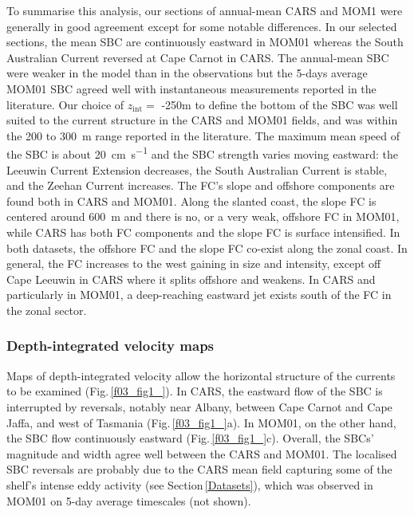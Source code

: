 \documentclass[preprint,3p,review,12pt]{elsarticle}
\newcommand{\sub}[1]{_{\text{#1}}}
\begin{document}
To summarise this analysis, our sections of annual-mean CARS and MOM1 were generally in good agreement except for some notable differences. In our selected sections, the mean SBC are continuously eastward in MOM01 whereas the South Australian Current reversed at Cape Carnot in CARS. The annual-mean SBC were weaker in the model than in the observations but the 5-days average MOM01 SBC agreed well with instantaneous measurements reported in the literature. Our choice of $z\sub{int} =$ -250\si{\meter} to define the bottom of the SBC was well suited to the current structure in the CARS and MOM01 fields, and was within the \num{200} to \SI{300}{\meter} range reported in the literature.
The maximum mean speed of the SBC is about
\SI{20}{\centi\meter\per\second} and
the SBC strength varies moving eastward: the Leeuwin Current Extension decreases, the South Australian Current is stable, and the Zeehan Current increases.
The FC's slope and offshore components are
found both in CARS and MOM01. Along the slanted coast, the slope FC is centered around \SI{600}{\meter} and there is no, or a very weak, offshore FC in MOM01, while CARS has both FC components and the slope FC is surface intensified. In both datasets, the offshore FC and the slope FC co-exist along the zonal coast. In general, the FC increases to the west gaining in size and intensity, except off Cape Leeuwin in CARS where it splits offshore and weakens. In CARS and particularly in MOM01, a deep-reaching eastward jet exists south of the FC in the zonal sector.

\subsubsection{Depth-integrated velocity maps}\label{Depth-integrated velocity maps}
Maps of depth-integrated velocity allow the horizontal structure of the currents to be examined (Fig.\,\ref{f03_fig1_}). In CARS, the eastward flow of the SBC is interrupted by reversals, notably near Albany, between Cape Carnot and Cape Jaffa, and west of Tasmania (Fig.\,\ref{f03_fig1_}a). In MOM01, on the other hand, the SBC flow continuously eastward (Fig.\,\ref{f03_fig1_}c). Overall, the SBCs' magnitude and width agree well between the CARS and MOM01.
The localised SBC reversals are probably due to the CARS mean field capturing some of the shelf's intense eddy activity (see Section\,\ref{Datasets}), which was observed in MOM01 on 5-day average timescales (not shown).
\end{document}
